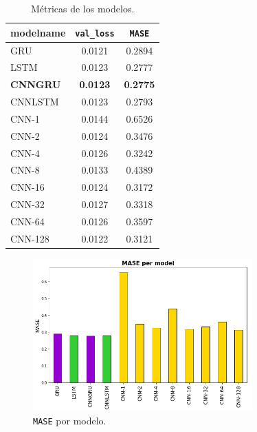 \documentclass[a4paper,12pt]{article}
\begin{document}
\begin{table}[H]
\centering
\begin{tabular}{lcc}
\hline
\multicolumn{1}{r}{modelname} & \texttt{val\_loss} & \texttt{MASE} \\ \hline
GRU                                    & 0.0121    & 0.2894        \\
LSTM                                   & 0.0123    & 0.2777        \\
\textbf{CNNGRU}                                 & \textbf{0.0123}    & \textbf{0.2775}        \\
CNNLSTM                                & 0.0123    & 0.2793        \\
CNN-1                                  & 0.0144    & 0.6526        \\
CNN-2                                  & 0.0124    & 0.3476        \\
CNN-4                                  & 0.0126    & 0.3242        \\
CNN-8                                  & 0.0133    & 0.4389        \\
CNN-16                                 & 0.0124    & 0.3172        \\
CNN-32                                 & 0.0127    & 0.3318        \\
CNN-64                                 & 0.0126    & 0.3597        \\
CNN-128                                & 0.0122    & 0.3121        \\ \hline
\end{tabular}
\caption{Métricas de los modelos.}
\label{tab:metrics-models}
\end{table}

\begin{figure}[H]
	\begin{center}
	\includegraphics[width=0.75\textwidth]{mase_per_model.png}
  	\caption{\texttt{MASE} por modelo.}
  	\label{fig:mase_per_model}
  	\end{center}
\end{figure}
\end{document}
